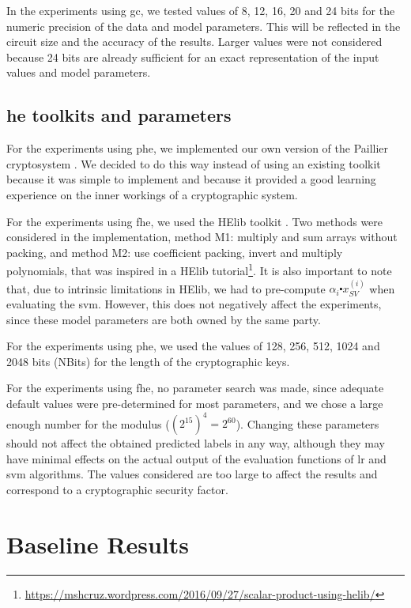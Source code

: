 In the experiments using \ac{gc}, we tested values of 8, 12, 16, 20 and 24 bits for the numeric precision of the data and model parameters. This will be reflected in the circuit size and the accuracy of the results. Larger values were not considered because 24 bits are already sufficient for an exact representation of the input values and model parameters.

\subsection{\acl{he} toolkits and parameters}

For the experiments using \ac{phe}, we implemented our own version of the Paillier cryptosystem \cite{paillier1999public}. We decided to do this way instead of using an existing toolkit because it was simple to implement and because it provided a good learning experience on the inner workings of a cryptographic system.

For the experiments using \ac{fhe}, we used the HElib toolkit \cite{halevi2014helib}. Two methods were considered in the implementation, method M1: multiply and sum arrays without packing, and method M2: use coefficient packing, invert and multiply polynomials, that was inspired in a HElib tutorial\footnote{\url{https://mshcruz.wordpress.com/2016/09/27/scalar-product-using-helib/}}. It is also important to note that, due to intrinsic limitations in HElib, we had to pre-compute $\alpha_i\centerdot x_{SV}^{(i)}$ when evaluating the \ac{svm}. However, this does not negatively affect the experiments, since these model parameters are both owned by the same party.

For the experiments using \ac{phe}, we used the values of 128, 256, 512, 1024 and 2048 bits (NBits) for the length of the cryptographic keys.

For the experiments using \ac{fhe}, no parameter search was made, since adequate default values were pre-determined for most parameters, and we chose a large enough number for the modulus ($(2^{15})^4=2^{60}$). Changing these parameters should not affect the obtained predicted labels in any way, although they may have minimal effects on the actual output of the evaluation functions of \ac{lr} and \ac{svm} algorithms. The values considered are too large to affect the results and correspond to a cryptographic security factor.


\section{Baseline Results}
\label{sec:ExperimentalResultsBaseline}


